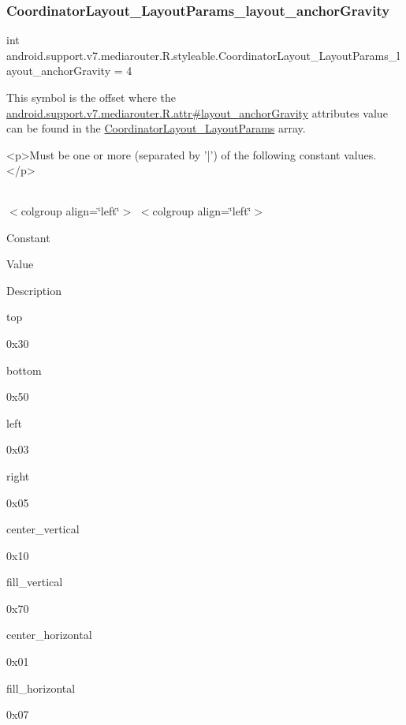 \subsubsection{\texorpdfstring{Coordinator\+Layout\+\_\+\+Layout\+Params\+\_\+layout\+\_\+anchor\+Gravity}{CoordinatorLayout\_LayoutParams\_layout\_anchorGravity}}
{\footnotesize\ttfamily int android.\+support.\+v7.\+mediarouter.\+R.\+styleable.\+Coordinator\+Layout\+\_\+\+Layout\+Params\+\_\+layout\+\_\+anchor\+Gravity = 4\hspace{0.3cm}{\ttfamily [static]}}

This symbol is the offset where the \hyperlink{classandroid_1_1support_1_1v7_1_1mediarouter_1_1R_1_1attr_a9aed551fd040263a028c9e8fa00edde7}{android.\+support.\+v7.\+mediarouter.\+R.\+attr\#layout\+\_\+anchor\+Gravity} attribute\textquotesingle{}s value can be found in the \hyperlink{classandroid_1_1support_1_1v7_1_1mediarouter_1_1R_1_1styleable_a751aa4d9918369b542c5387a38a26624}{Coordinator\+Layout\+\_\+\+Layout\+Params} array.

\begin{DoxyVerb}      <p>Must be one or more (separated by '|') of the following constant values.</p>
\end{DoxyVerb}
 \tabulinesep=1mm
\begin{longtabu} spread 0pt [c]{*{0}{|X[-1]}|}
\hline
\end{longtabu}
$<$colgroup align=\char`\"{}left\char`\"{}$>$ $<$colgroup align=\char`\"{}left\char`\"{}$>$ 

Constant

Value

Description 

{\ttfamily top}

0x30

{\ttfamily bottom}

0x50

{\ttfamily left}

0x03

{\ttfamily right}

0x05

{\ttfamily center\+\_\+vertical}

0x10

{\ttfamily fill\+\_\+vertical}

0x70

{\ttfamily center\+\_\+horizontal}

0x01

{\ttfamily fill\+\_\+horizontal}

0x07

